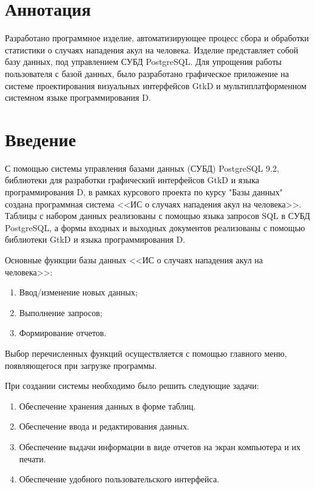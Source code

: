 \documentclass[russian,utf8,simple,emptystyle]{eskdtext}
\begin{document}
\tableofcontents
\newpage

\section{Аннотация}
Разработано программное изделие, автоматизирующее процесс сбора и обработки статистики о случаях нападения акул на человека. Изделие представляет собой базу данных, под управлением СУБД PostgreSQL. Для упрощения работы пользователя с базой данных, было разработано графическое приложение на системе проектирования визуальных интерфейсов GtkD и мультиплатформенном системном языке программирования D.
\clearpage

\section{Введение}
С помощью системы управления базами данных (СУБД) PostgreSQL 9.2, библиотеки для разработки графический интерфейсов GtkD и языка программирования D, в рамках курсового проекта по курсу "Базы данных" создана программная система <<ИС о случаях нападения акул на человека>>. Таблицы с набором данных реализованы с помощью языка запросов SQL в СУБД PostgreSQL, а формы входных и выходных документов реализованы с помощью библиотеки GtkD и языка программирования D.

Основные функции базы данных <<ИС о случаях нападения акул на человека>>:
\begin{enumerate}
\item Ввод/изменение новых данных;
\item Выполнение запросов;
\item Формирование отчетов.
\end{enumerate}

Выбор перечисленных функций осуществляется с помощью главного меню, появляющегося при загрузке программы.

При создании системы необходимо было решить следующие задачи:
\begin{enumerate}
\item Обеспечение хранения данных в форме таблиц.
\item Обеспечение ввода и редактирования данных.
\item Обеспечение выдачи информации в виде отчетов на экран компьютера и их печати.
\item Обеспечение удобного пользовательского интерфейса.
\end{enumerate}
\end{document}
